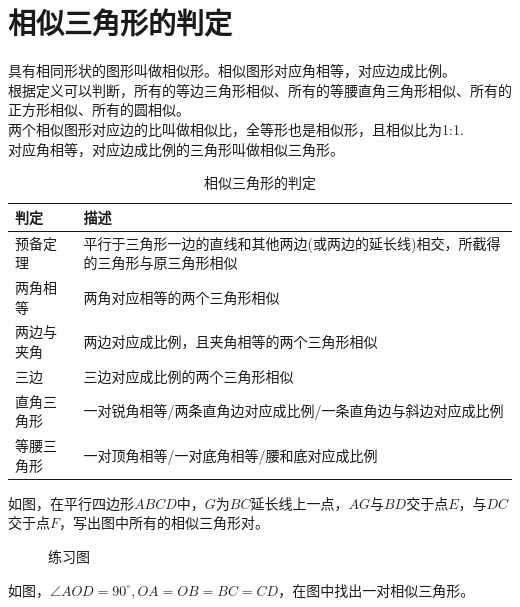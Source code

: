 \section{相似三角形的判定}
\begin{theorem}
    具有相同形状的图形叫做相似形。相似图形对应角相等，对应边成比例。\\
    根据定义可以判断，所有的等边三角形相似、所有的等腰直角三角形相似、所有的正方形相似、所有的圆相似。\\
    两个相似图形对应边的比叫做相似比，全等形也是相似形，且相似比为1:1. \\
    对应角相等，对应边成比例的三角形叫做相似三角形。
\end{theorem}
\begin{table}[H]
    \centering
    \caption{相似三角形的判定}
    \begin{tabular}{l|p{12cm}}
        \hline
        \hline
        判定    & 描述                                         \\
        \hline
        预备定理  & 平行于三角形一边的直线和其他两边(或两边的延长线)相交，所截得的三角形与原三角形相似 \\
        \hline
        两角相等  & 两角对应相等的两个三角形相似                             \\
        \hline
        两边与夹角 & 两边对应成比例，且夹角相等的两个三角形相似                      \\
        \hline
        三边    & 三边对应成比例的两个三角形相似                            \\
        \hline
        直角三角形 & 一对锐角相等/两条直角边对应成比例/一条直角边与斜边对应成比例            \\
        \hline
        等腰三角形 & 一对顶角相等/一对底角相等/腰和底对应成比例                     \\
        \hline
        \hline
    \end{tabular}
\end{table}
\begin{problem}
如图，在平行四边形$ABCD$中，$G$为$BC$延长线上一点，$AG$与$BD$交于点$E$，与$DC$交于点$F$，写出图中所有的相似三角形对。
\end{problem}
\begin{figure}[H]
    \centering
    \resizebox{4cm}{!}{}
    \caption{练习图}
\end{figure}
\begin{problem}
如图，$\angle AOD=90^\circ,OA=OB=BC=CD$，在图中找出一对相似三角形。
\end{problem}

